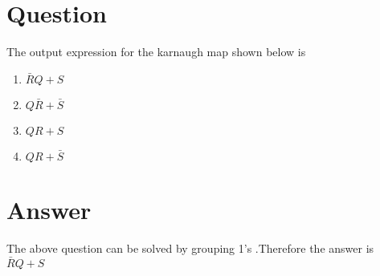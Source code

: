 \documentclass[journal,12pt,twocolumn]{IEEEtran}
\title{\ktitle}
\author{\kauthor\\\kcontact\\\kmodule}
\begin{document}
\maketitle
\tableofcontents
\section{\textbf{Question}}
The output expression for the karnaugh map shown below is\\
\begin{enumerate}[label=(\Alph*)]
 \item $\bar R Q + S$
 \item $Q\bar R + \bar S$
 \item $QR + S$
 \item $QR + \bar S$  
\end{enumerate}
\section{\textbf{Answer}}
The above question can be solved by grouping 1's .Therefore the answer is $\bar R Q + S$\\
\end{document}
